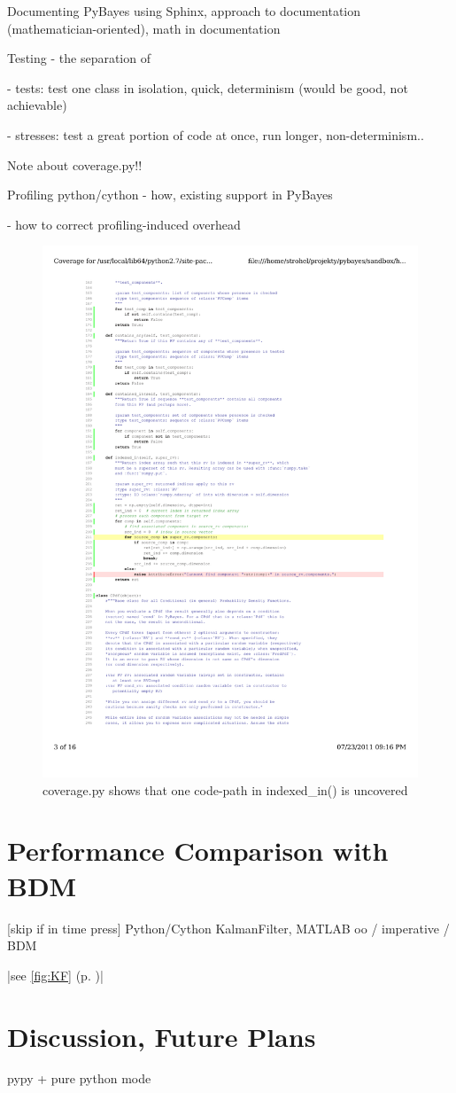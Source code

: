 Documenting PyBayes using Sphinx, approach to documentation (mathematician-oriented), math in documentation

Testing - the separation of

- tests: test one class in isolation, quick, determinism (would be good, not achievable)

- stresses: test a great portion of code at once, run longer, non-determinism..

Note about coverage.py!!

Profiling python/cython - how, existing support in PyBayes

- how to correct profiling-induced overhead

\begin{figure}[h]
	\centering
	\includegraphics[width=\textwidth,keepaspectratio=true,clip=true,trim=24mm 109mm 60mm 117mm]{./coverage.pdf}
	\vspace{-8mm}
	\caption{coverage.py shows that one code-path in indexed\_in() is uncovered}
	\label{fig:Coverage}
\end{figure}

\section{Performance Comparison with BDM} \label{sec:PyBayesPerformance}

[skip if in time press]
Python/Cython KalmanFilter, MATLAB oo / imperative / BDM

|see \autoref{fig:KF} (p. \pageref{fig:KF})|

\section{Discussion, Future Plans}

pypy + pure python mode
